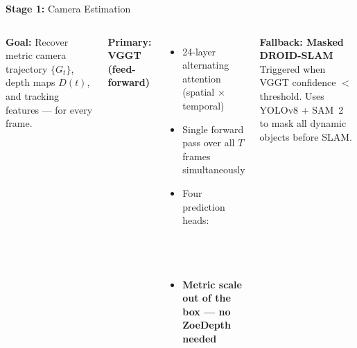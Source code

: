 \documentclass[aspectratio=169,11pt]{beamer}
\newcommand{\highlight}[1]{\textcolor{tamumaroon}{\textbf{#1}}}
\newcommand{\stage}[2]{\textcolor{accentblue}{\textbf{Stage #1:}} #2}
\begin{document}
\begin{frame}{\stage{1}{Camera Estimation}}
  \begin{columns}[T]
      \textbf{Goal:} Recover metric camera trajectory $\{G_t\}$, depth maps $D(t)$,
      and tracking features — for every frame.

      \vspace{0.6em}
      \textbf{Primary: VGGT (feed-forward)}
      \begin{itemize}
        \item 24-layer alternating attention (spatial $\times$ temporal)
        \item Single forward pass over all $T$ frames simultaneously
        \item Four prediction heads:\\
          \hspace{0.5em}{\small Camera $\to$ SE(3) poses $+$ intrinsics}\\
          \hspace{0.5em}{\small Depth (DPT) $\to$ metric depth $D(t)$}\\
          \hspace{0.5em}{\small Point $\to$ 3D point cloud}\\
          \hspace{0.5em}{\small Track features $\to$ cross-frame correspondences}
        \item \highlight{Metric scale out of the box — no ZoeDepth needed}
      \end{itemize}

      \vspace{0.4em}
      \textbf{Fallback: Masked DROID-SLAM}\\
      {\small Triggered when VGGT confidence $<$ threshold.
      Uses YOLOv8 + SAM~2 to mask all dynamic objects before SLAM.}


\end{columns}
\end{frame}
\end{document}
